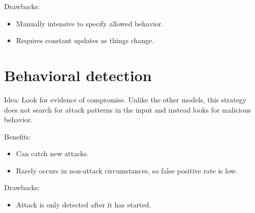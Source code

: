 Drawbacks:
\begin{itemize}
    \item Manually intensive to specify allowed behavior.
    \item Requires constant updates as things change.
\end{itemize}

\section{Behavioral detection}
Idea: Look for evidence of compromise. Unlike the other models, this strategy does not search for attack patterns in the input and instead looks for malicious behavior.

\medskip
Benefits:
\begin{itemize}
    \item Can catch new attacks.
    \item Rarely occurs in non-attack circumstances, so false positive rate is low.
\end{itemize}

Drawbacks:
\begin{itemize}
    \item Attack is only detected after it has started.
\end{itemize}